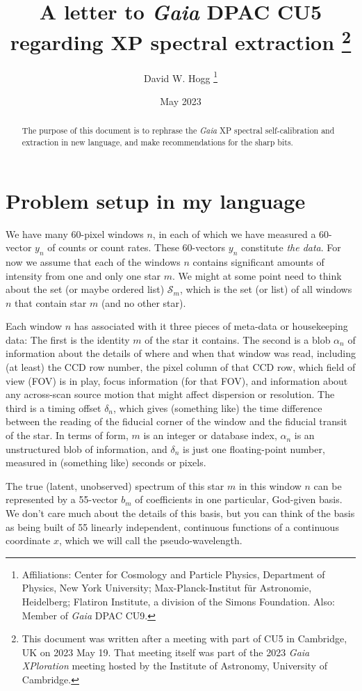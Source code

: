 \documentclass[11pt]{article}
\title{\bfseries
A letter to \textsl{Gaia} DPAC CU5 regarding XP spectral extraction%
\footnote{This document was written after a meeting with part of CU5 in Cambridge, UK on 2023 May 19. That meeting itself was part of the 2023 \textsl{Gaia XPloration} meeting hosted by the Institute of Astronomy, University of Cambridge.}}
\author{David W. Hogg%
\footnote{Affiliations: Center for Cosmology and Particle Physics, Department of Physics, New York University; Max-Planck-Institut f\"ur Astronomie, Heidelberg; Flatiron Institute, a division of the Simons Foundation. Also: Member of \textsl{Gaia} DPAC CU9.}}
\date{May 2023}
\begin{document}
\maketitle\thispagestyle{empty}

\begin{abstract}\noindent
    The purpose of this document is to rephrase the \textsl{Gaia} XP spectral self-calibration and extraction in new language, and make recommendations for the sharp bits.
\end{abstract}

\section{Problem setup in my language}

We have many 60-pixel windows $n$, in each of which we have measured a 60-vector $y_n$ of counts or count rates.
These 60-vectors $y_n$ constitute \emph{the data}.
For now we assume that each of the windows $n$ contains significant amounts of intensity from one and only one star $m$.
We might at some point need to think about the set (or maybe ordered list) $\mathscr{S}_m$, which is the set (or list) of all windows $n$ that contain star $m$ (and no other star).

Each window $n$ has associated with it three pieces of meta-data or housekeeping data:
The first is the identity $m$ of the star it contains.
The second is a blob $\alpha_n$ of information about the details of where and when that window was read, including (at least) the CCD row number, the pixel column of that CCD row, which field of view (FOV) is in play, focus information (for that FOV), and information about any across-scan source motion that might affect dispersion or resolution.
The third is a timing offset $\delta_n$, which gives (something like) the time difference between the reading of the fiducial corner of the window and the fiducial transit of the star.
In terms of form, $m$ is an integer or database index, $\alpha_n$ is an unstructured blob of information, and $\delta_n$ is just one floating-point number, measured in (something like) seconds or pixels.

The true (latent, unobserved) spectrum of this star $m$ in this window $n$ can be represented by a 55-vector $b_m$ of coefficients in one particular, God-given basis.
We don't care much about the details of this basis, but you can think of the basis as being built of 55 linearly independent, continuous functions of a continuous coordinate $x$, which we will call the pseudo-wavelength.
\end{document}
